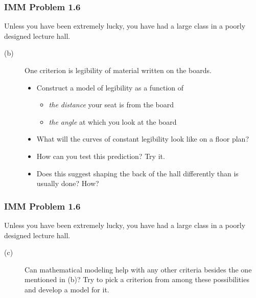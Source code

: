 \begin{frame}
    \frametitle{IMM Problem 1.6}
    Unless you have been extremely lucky, you have had a large class in a
    poorly designed lecture hall. 
    \vskip0.15in
    \begin{description}
        \item[(b)] One criterion is legibility of material written on the boards. 
        \begin{itemize}
            \item Construct a model of legibility as a function of 
                \begin{itemize}
                    \item  \emph{the distance} your seat is from the board 
                    \item \emph{the angle} at which you look at the board 
                \end{itemize}
            \item What will the curves of constant legibility look like on a
                floor plan?
            \item How can you test this prediction? Try it. 
            \item Does this suggest shaping the back of the hall differently
                than is usually done? How?
        \end{itemize}    
    \end{description}
    \vfill
\end{frame}
     
\begin{frame}
    \frametitle{IMM Problem 1.6}
    Unless you have been extremely lucky, you have had a large class in a
    poorly designed lecture hall. 
    
    \vskip0.25in
    \begin{description}
        \item[(c)] Can mathematical modeling help with any other criteria
    besides the one mentioned in (b)? Try to pick a criterion from among these
    possibilities and develop a model for it.
    \end{description}
\end{frame}



